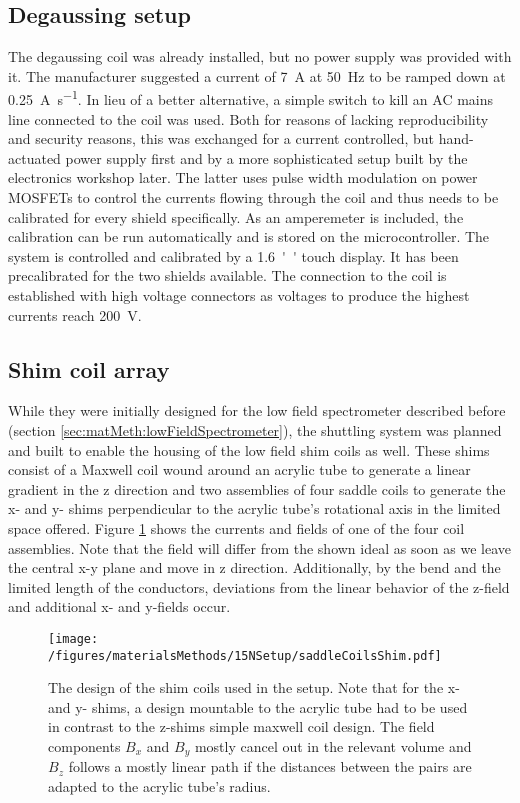        \subsection{Degaussing setup}
        \label{sec:matMeth:degaussing}
        The degaussing coil was already installed, but no power supply was provided with it. The manufacturer suggested a current of \SI{7}{\ampere} at \SI{50}{\hertz} to be ramped down at \SI{0.25}{\ampere\per\second}. In lieu of a better alternative, a simple switch to kill an AC mains line connected to the coil was used. Both for reasons of lacking reproducibility and security reasons, this was exchanged for a current controlled, but hand-actuated power supply first and by a more sophisticated setup built by the electronics workshop later. The latter uses pulse width modulation on power MOSFETs to control the currents flowing through the coil and thus needs to be calibrated for every shield specifically. As an amperemeter is included, the calibration can be run automatically and is stored on the microcontroller. The system is controlled and calibrated by a \SI{1.6}{''} touch display. It has been precalibrated for the two shields available. The connection to the coil is established with high voltage connectors as voltages to produce the highest currents reach \SI{200}{\volt}.
        \subsection{Shim coil array}
        While they were initially designed for the low field spectrometer described before (section \ref{sec:matMeth:lowFieldSpectrometer}), the shuttling system was planned and built to enable the housing of the low field shim coils as well. These shims consist of a Maxwell coil wound around an acrylic tube to generate a linear gradient in the z direction and two assemblies of four saddle coils to generate the x- and y- shims perpendicular to the acrylic tube's rotational axis in the limited space offered.
        Figure \ref{figure:matMeth:shimCoilArray} shows the currents and fields of one of the four coil assemblies. Note that the field will differ from the shown ideal as soon as we leave the central x-y plane and move in z direction. Additionally, by the bend and the limited length of the conductors, deviations from the linear behavior of the z-field and additional x- and y-fields occur.
        \begin{figure}
            \texttt{[image: /figures/materialsMethods/15NSetup/saddleCoilsShim.pdf]}
            \caption[Shim coil design]{The design of the shim coils used in the setup. Note that for the x- and y- shims, a design mountable to the acrylic tube had to be used in contrast to the z-shims simple maxwell coil design. The field components $B_x$ and $B_y$ mostly cancel out in the relevant volume and $B_z$ follows a mostly linear path if the distances between the pairs are adapted to the acrylic tube's radius.}
            \label{figure:matMeth:shimCoilArray}
        \end{figure}
